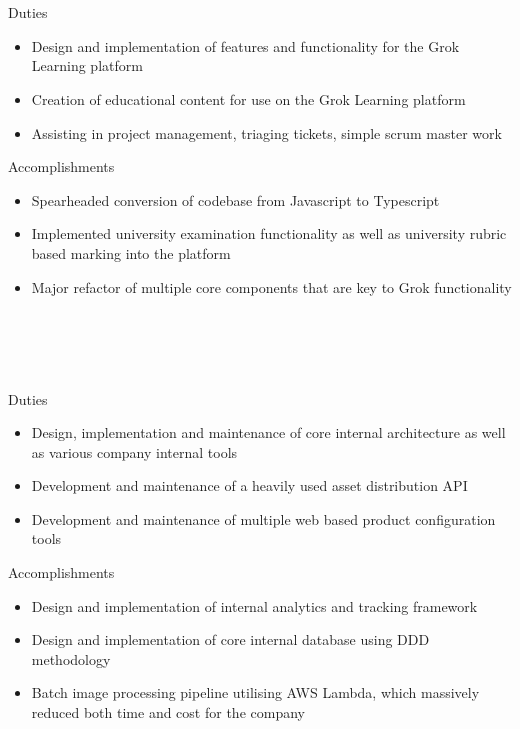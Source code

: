 \documentclass{resume}
\begin{document}
\bigskip
{} \\
 \\
Duties \\
\begin{itemize}
  \item Design and implementation of features and functionality for the Grok Learning platform
  \item Creation of educational content for use on the Grok Learning platform
  \item Assisting in project management, triaging tickets, simple scrum master work
\end{itemize}
Accomplishments \\
\begin{itemize}
  \item Spearheaded conversion of codebase from Javascript to Typescript
  \item Implemented university examination functionality as well as university rubric based marking into the platform
  \item Major refactor of multiple core components that are key to Grok functionality
\end{itemize}

\bigskip
{} \\
 \\
 \\
 \\
Duties \\
\begin{itemize}
  \item Design, implementation and maintenance of core internal architecture as well as various company internal tools
  \item Development and maintenance of a heavily used asset distribution API
  \item Development and maintenance of multiple web based product configuration tools
\end{itemize}
Accomplishments \\
\begin{itemize}
  \item Design and implementation of internal analytics and tracking framework
  \item Design and implementation of core internal database using DDD methodology 
  \item Batch image processing pipeline utilising AWS Lambda, which massively reduced both time and cost for the company
\end{itemize}
\end{document}
